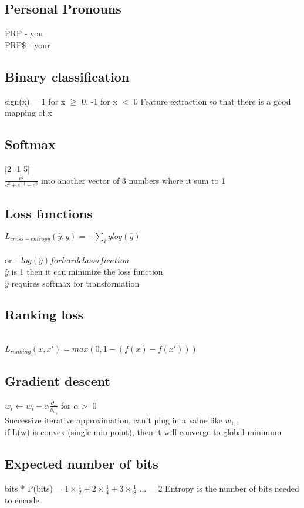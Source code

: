 \documentclass[11pt]{article}
\begin{document}
\begin{multicols*}{3}
\subsection*{Personal Pronouns}
PRP - you\\
PRP\$ - your
\subsection*{Binary classification}
sign(x) = 1 for x $\geq$ 0, -1 for x $<$ 0
Feature extraction so that there is a good mapping of x
\subsection*{Softmax}
[2 -1 5]\\
\(\frac{e^{2}}{e^{2} + e^{-1} + e^{5}}\) into another vector of 3 numbers where it sum to 1
\\
\subsection*{Loss functions}
$L_{cross-entropy} (\hat{y}, y) = - \sum\limits_{i} y log (\hat{y})$\\
\\
or $- log(\hat{y}) for hard classification$\\
$\hat{y}$ is 1 then it can minimize the loss function\\
$\hat{y}$ requires softmax for transformation\\
\subsection*{Ranking loss}\\
$L_{ranking} (x, x') = max(0, 1 - (f(x) - f(x')))$
\subsection*{Gradient descent}
$w_{i} \leftarrow w_{i} - \alpha \frac{\partial_{L}}{\partial_{w_{i}}}$ for $\alpha >$ 0\\
Successive iterative approximation, can't plug in a value like $w_{1, 1}$\\
if L(w) is convex (single min point), then it will converge to global minimum
\subsection*{Expected number of bits}
\sum bits * P(bits) = $1 \times \frac{1}{2} + 2 \times \frac{1}{4} + 3 \times \frac{1}{8}$ ... = 2
Entropy is the number of bits needed to encode

\end{multicols*}
\end{document}
